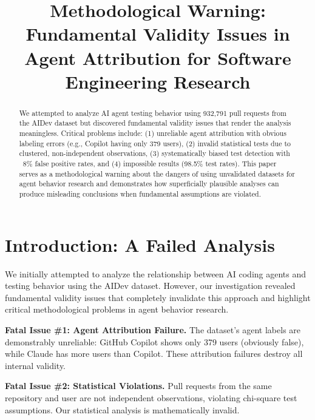 \documentclass[conference]{IEEEtran}
\begin{document}
\title{Methodological Warning: Fundamental Validity Issues in Agent Attribution for Software Engineering Research}

\author{
}

\maketitle

\begin{abstract}
We attempted to analyze AI agent testing behavior using 932{,}791 pull requests from the AIDev dataset but discovered fundamental validity issues that render the analysis meaningless. Critical problems include: (1) unreliable agent attribution with obvious labeling errors (e.g., Copilot having only 379 users), (2) invalid statistical tests due to clustered, non-independent observations, (3) systematically biased test detection with ~8\% false positive rates, and (4) impossible results (98.5\% test rates). This paper serves as a methodological warning about the dangers of using unvalidated datasets for agent behavior research and demonstrates how superficially plausible analyses can produce misleading conclusions when fundamental assumptions are violated.
\end{abstract}

\section{Introduction: A Failed Analysis}
We initially attempted to analyze the relationship between AI coding agents and testing behavior using the AIDev dataset. However, our investigation revealed fundamental validity issues that completely invalidate this approach and highlight critical methodological problems in agent behavior research.

\textbf{Fatal Issue \#1: Agent Attribution Failure.} The dataset's agent labels are demonstrably unreliable: GitHub Copilot shows only 379 users (obviously false), while Claude has more users than Copilot. These attribution failures destroy all internal validity.

\textbf{Fatal Issue \#2: Statistical Violations.} Pull requests from the same repository and user are not independent observations, violating chi-square test assumptions. Our statistical analysis is mathematically invalid.
\end{document}
